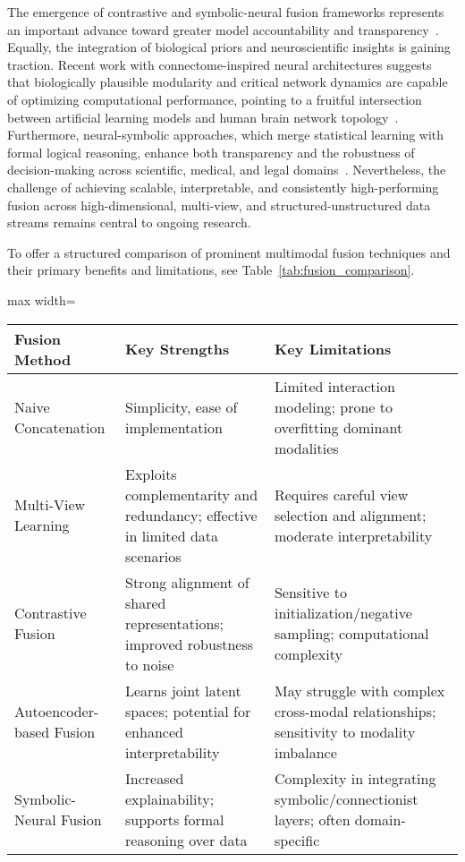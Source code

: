 \documentclass[sigconf]{acmart}
\begin{document}
The emergence of contrastive and symbolic-neural fusion frameworks represents an important advance toward greater model accountability and transparency~\cite{ref46,ref47,ref48,ref50,ref88}. Equally, the integration of biological priors and neuroscientific insights is gaining traction. Recent work with connectome-inspired neural architectures suggests that biologically plausible modularity and critical network dynamics are capable of optimizing computational performance, pointing to a fruitful intersection between artificial learning models and human brain network topology~\cite{ref90}. Furthermore, neural-symbolic approaches, which merge statistical learning with formal logical reasoning, enhance both transparency and the robustness of decision-making across scientific, medical, and legal domains~\cite{ref46,ref47,ref48,ref49,ref50}. Nevertheless, the challenge of achieving scalable, interpretable, and consistently high-performing fusion across high-dimensional, multi-view, and structured-unstructured data streams remains central to ongoing research.

To offer a structured comparison of prominent multimodal fusion techniques and their primary benefits and limitations, see Table~\ref{tab:fusion_comparison}.

\begin{table*}[htbp]
\centering
\caption{Comparison of Representative Multimodal Fusion Strategies}
\label{tab:fusion_comparison}
\begin{adjustbox}{max width=\textwidth}
\begin{tabular}{lll}
\toprule
\textbf{Fusion Method} & \textbf{Key Strengths} & \textbf{Key Limitations} \\
\midrule
Naive Concatenation & Simplicity, ease of implementation & Limited interaction modeling; prone to overfitting dominant modalities \\
Multi-View Learning & Exploits complementarity and redundancy; effective in limited data scenarios & Requires careful view selection and alignment; moderate interpretability \\
Contrastive Fusion & Strong alignment of shared representations; improved robustness to noise & Sensitive to initialization/negative sampling; computational complexity \\
Autoencoder-based Fusion & Learns joint latent spaces; potential for enhanced interpretability & May struggle with complex cross-modal relationships; sensitivity to modality imbalance \\
Symbolic-Neural Fusion & Increased explainability; supports formal reasoning over data & Complexity in integrating symbolic/connectionist layers; often domain-specific\\
\bottomrule
\end{tabular}
\end{adjustbox}
\end{table*}
\end{document}
